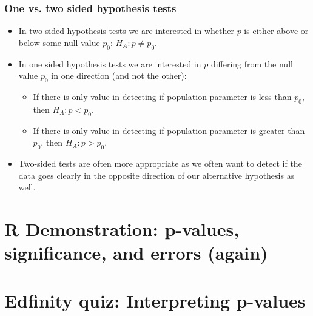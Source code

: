 \documentclass[t,compress,mathserif]{beamer}
\begin{document}
\begin{frame}
\frametitle{One vs. two sided hypothesis tests}

\begin{itemize}

\item In two sided hypothesis tests we are interested in whether $p$ is either above or below some null value $p_0$: $H_A: p \ne p_0$.

\item In one sided hypothesis tests we are interested in $p$ differing from the null value $p_0$ in one direction (and not the other):
\begin{itemize}
\item If there is only value in detecting if population parameter is less than $p_0$, then $H_A: p < p_0$.
\item If there is only value in detecting if population parameter is greater than $p_0$, then $H_A: p > p_0$.
\end{itemize}

\item Two-sided tests are often more appropriate as we often want to detect if the data goes clearly in the opposite direction of our alternative hypothesis as well.

\end{itemize}

\end{frame}


\section{R Demonstration: p-values, significance, and errors (again)}


\section{Edfinity quiz: Interpreting p-values}


\end{document}
